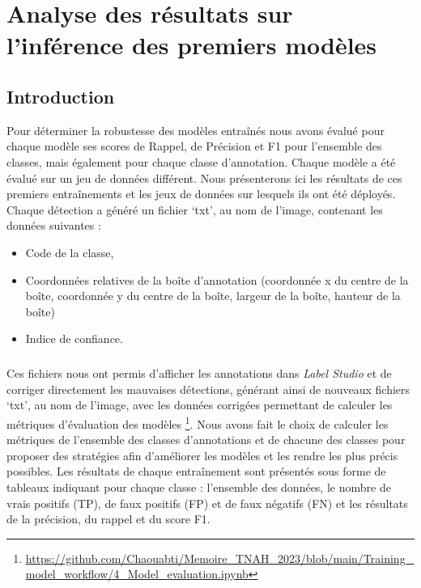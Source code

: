 \documentclass[12pt,twoside]{book}
\begin{document}
\chapter{Analyse des résultats sur l’inférence des premiers modèles }

\section{Introduction}

Pour déterminer la robustesse des modèles entraînés nous avons évalué pour chaque modèle ses scores de Rappel, de Précision et F1 pour l’ensemble des classes, mais également pour chaque classe d’annotation. Chaque modèle a été évalué sur un jeu de données différent. Nous présenterons ici les résultats de ces premiers entraînements et les jeux de données sur lesquels ils ont été déployés. Chaque détection a généré un fichier ‘txt’, au nom de l’image, contenant les données suivantes : \\
\begin{itemize}
    \item Code de la classe,
    \item Coordonnées relatives de la boîte d’annotation (coordonnée x du centre de la boîte, coordonnée y du centre de la boîte, largeur de la boîte, hauteur de la boîte)
    \item Indice de confiance.
\end{itemize}

\paragraph{}Ces fichiers nous ont permis d’afficher les annotations dans \textit{Label Studio} et de corriger directement les mauvaises détections, générant ainsi de nouveaux fichiers ‘txt’, au nom de l’image, avec les données corrigées permettant de calculer les métriques d’évaluation des modèles \footnote{\url{https://github.com/Chaouabti/Memoire_TNAH_2023/blob/main/Training_model_workflow/4_Model_evaluation.ipynb}}. Nous avons fait le choix de calculer les métriques de l’ensemble des classes d’annotations et de chacune des classes pour proposer des stratégies afin d’améliorer les modèles et les rendre les plus précis possibles. Les résultats de chaque entraînement sont présentés sous forme de tableaux indiquant pour chaque classe : l’ensemble des données, le nombre de vrais positifs (TP), de faux positifs (FP) et de faux négatifs (FN) et les résultats de la précision, du rappel et du score F1.
\end{document}
